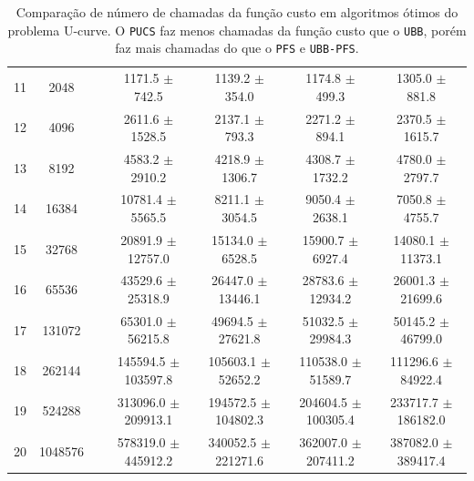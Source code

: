 \documentclass[12pt]{article}
\newcommand{\algname}[1]{\texttt{#1}}
\begin{document}
\begin{table}
{\begin{tabular}{cc c cccc}
11 &    2048 && 1171.5 $\pm$ 742.5 & 1139.2 $\pm$ 354.0 & 1174.8 $\pm$ 499.3 & 1305.0 $\pm$ 881.8 \\
12 &    4096 && 2611.6 $\pm$ 1528.5 & 2137.1 $\pm$ 793.3 & 2271.2 $\pm$ 894.1 & 2370.5 $\pm$ 1615.7 \\
13 &    8192 && 4583.2 $\pm$ 2910.2 & 4218.9 $\pm$ 1306.7 & 4308.7 $\pm$ 1732.2 & 4780.0 $\pm$ 2797.7 \\
14 &   16384 && 10781.4 $\pm$ 5565.5 & 8211.1 $\pm$ 3054.5 & 9050.4 $\pm$ 2638.1 & 7050.8 $\pm$ 4755.7 \\
15 &   32768 && 20891.9 $\pm$ 12757.0 & 15134.0 $\pm$ 6528.5 & 15900.7 $\pm$ 6927.4 & 14080.1 $\pm$ 11373.1 \\
16 &   65536 && 43529.6 $\pm$ 25318.9 & 26447.0 $\pm$ 13446.1 & 28783.6 $\pm$ 12934.2 & 26001.3 $\pm$ 21699.6 \\
17 &  131072 && 65301.0 $\pm$ 56215.8 & 49694.5 $\pm$ 27621.8 & 51032.5 $\pm$ 29984.3 & 50145.2 $\pm$ 46799.0 \\
18 &  262144 && 145594.5 $\pm$ 103597.8 & 105603.1 $\pm$ 52652.2 & 110538.0 $\pm$ 51589.7 & 111296.6 $\pm$ 84922.4 \\
19 &  524288 && 313096.0 $\pm$ 209913.1 & 194572.5 $\pm$ 104802.3 & 204604.5 $\pm$ 100305.4 & 233717.7 $\pm$ 186182.0 \\
20 & 1048576 && 578319.0 $\pm$ 445912.2 & 340052.5 $\pm$ 221271.6 & 362007.0 $\pm$ 207411.2 & 387082.0 $\pm$ 389417.4 \\
\bottomrule
\end{tabular}
}
\caption{Comparação de número de chamadas da função custo em algoritmos
ótimos do problema U-curve. O \algname{PUCS} faz menos chamadas da
função custo que o \algname{UBB}, porém faz mais chamadas do que o 
\algname{PFS} e \algname{UBB-PFS}.}
\label{tab:pucs:small:cost}
\end{table}
\end{document}
